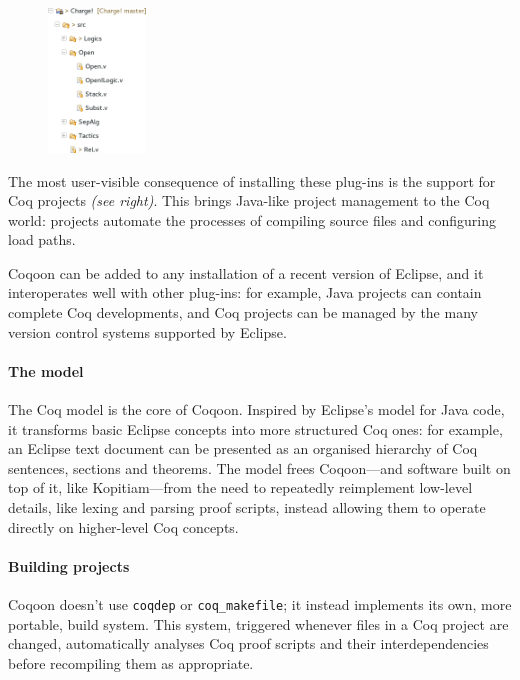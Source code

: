 \documentclass{article}
\begin{document}
\begin{figure}
\includegraphics[width=0.23\textwidth]{project}
\end{figure}
The most user-visible consequence of installing these plug-ins is the support
for Coq projects \emph{(see right)}. This brings Java-like project management
to the Coq world: projects automate the processes of compiling source files and
configuring load paths.

Coqoon can be added to any installation of a recent version of Eclipse, and it
interoperates well with other plug-ins: for example, Java projects can contain
complete Coq developments, and Coq projects can be managed by the many version
control systems supported by Eclipse.

\paragraph{The model}

The Coq model is the core of Coqoon. Inspired by Eclipse's model for Java code,
it transforms basic Eclipse concepts into more structured Coq ones: for
example, an Eclipse text document can be presented as an organised hierarchy of
Coq sentences, sections and theorems. The model frees Coqoon---and software
built on top of it, like Kopitiam---from the need to repeatedly reimplement
low-level details, like lexing and parsing proof scripts, instead allowing them
to operate directly on higher-level Coq concepts.

\paragraph{Building projects}

Coqoon doesn't use \texttt{coqdep} or \texttt{coq\_makefile}; it instead
implements its own, more portable, build system. This system, triggered
whenever files in a Coq project are changed, automatically analyses Coq proof
scripts and their interdependencies before recompiling them as appropriate.
\end{document}
